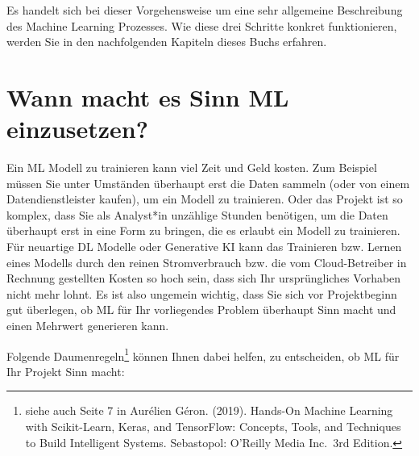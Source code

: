 \documentclass[
]{book}
\begin{document}
Es handelt sich bei dieser Vorgehensweise um eine sehr allgemeine Beschreibung des Machine Learning Prozesses. Wie diese drei Schritte konkret funktionieren, werden Sie in den nachfolgenden Kapiteln dieses Buchs erfahren.

\hypertarget{wann-macht-es-sinn-ml-einzusetzen}{%
\section{Wann macht es Sinn ML einzusetzen?}\label{wann-macht-es-sinn-ml-einzusetzen}}

Ein ML Modell zu trainieren kann viel Zeit und Geld kosten. Zum Beispiel müssen Sie unter Umständen überhaupt erst die Daten sammeln (oder von einem Datendienstleister kaufen), um ein Modell zu trainieren. Oder das Projekt ist so komplex, dass Sie als Analyst*in unzählige Stunden benötigen, um die Daten überhaupt erst in eine Form zu bringen, die es erlaubt ein Modell zu trainieren. Für neuartige DL Modelle oder Generative KI kann das Trainieren bzw. Lernen eines Modells durch den reinen Stromverbrauch bzw. die vom Cloud-Betreiber in Rechnung gestellten Kosten so hoch sein, dass sich Ihr ursprüngliches Vorhaben nicht mehr lohnt. Es ist also ungemein wichtig, dass Sie sich vor Projektbeginn gut überlegen, ob ML für Ihr vorliegendes Problem überhaupt Sinn macht und einen Mehrwert generieren kann.

Folgende Daumenregeln\footnote{siehe auch Seite 7 in Aurélien Géron. (2019). Hands-On Machine Learning with Scikit-Learn, Keras, and TensorFlow: Concepts, Tools, and Techniques to Build Intelligent Systems. Sebastopol: O'Reilly Media Inc.~3rd Edition.} können Ihnen dabei helfen, zu entscheiden, ob ML für Ihr Projekt Sinn macht:
\end{document}
